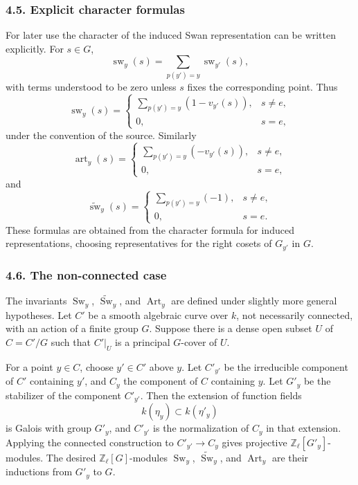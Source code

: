 \documentclass[14pt]{extarticle}
\newcommand{\ZZ}{\mathbb Z}
\newcommand{\Sw}{\operatorname{Sw}}
\newcommand{\Art}{\operatorname{Art}}
\newcommand{\wt}[1]{\widetilde{#1}}
\begin{document}
\subsubsection*{4.5. Explicit character formulas}

For later use the character of the induced Swan representation can be written explicitly. For $s\in G$,
\[
   \operatorname{sw}_y(s)=
   \sum_{p(y')=y}\operatorname{sw}_{y'}(s),
\]
with terms understood to be zero unless $s$ fixes the corresponding point. Thus
\[
   \operatorname{sw}_y(s)=
   \begin{cases}
      \sum_{p(y')=y}(1-v_{y'}(s)), & s\ne e,\\
      0, & s=e,
   \end{cases}
\]
under the convention of the source. Similarly
\[
   \operatorname{art}_y(s)=
   \begin{cases}
      \sum_{p(y')=y}(-v_{y'}(s)), & s\ne e,\\
      0, & s=e,
   \end{cases}
\]
and
\[
   \widetilde{\operatorname{sw}}_y(s)=
   \begin{cases}
      \sum_{p(y')=y}(-1), & s\ne e,\\
      0, & s=e.
   \end{cases}
\]
These formulas are obtained from the character formula for induced representations, choosing representatives for the right cosets of $G_{y'}$ in $G$.

\subsubsection*{4.6. The non-connected case}

The invariants $\Sw_y$, $\wt{\Sw}_y$, and $\Art_y$ are defined under slightly more general hypotheses. Let $C'$ be a smooth algebraic curve over $k$, not necessarily connected, with an action of a finite group $G$. Suppose there is a dense open subset $U$ of $C=C'/G$ such that $C'|_U$ is a principal $G$-cover of $U$.

For a point $y\in C$, choose $y'\in C'$ above $y$. Let $C'_{y'}$ be the irreducible component of $C'$ containing $y'$, and $C_y$ the component of $C$ containing $y$. Let $G'_{y}$ be the stabilizer of the component $C'_{y'}$. Then the extension of function fields
\[
   k(\eta_y)\subset k(\eta'_{y})
\]
is Galois with group $G'_y$, and $C'_{y'}$ is the normalization of $C_y$ in that extension. Applying the connected construction to $C'_{y'}\to C_y$ gives projective $\ZZ_\ell[G'_y]$-modules. The desired $\ZZ_\ell[G]$-modules $\Sw_y$, $\wt{\Sw}_y$, and $\Art_y$ are their inductions from $G'_y$ to $G$.
\end{document}
